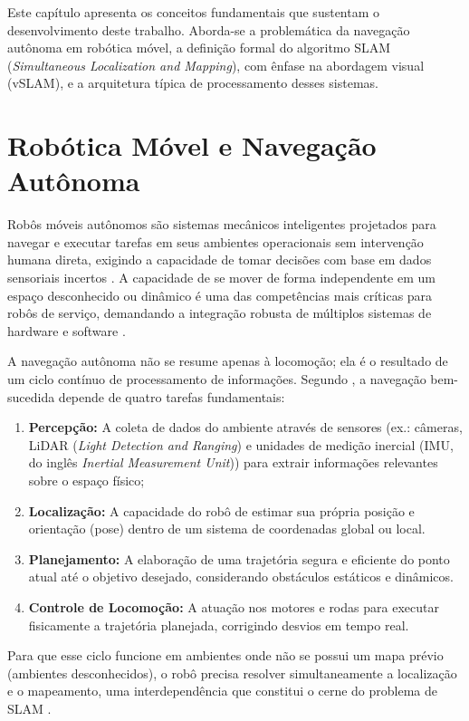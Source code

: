 Este capítulo apresenta os conceitos fundamentais que sustentam o desenvolvimento deste trabalho. Aborda-se a problemática da navegação autônoma em robótica móvel, a definição formal do algoritmo SLAM (\textit{Simultaneous Localization and Mapping}), com ênfase na abordagem visual (vSLAM), e a arquitetura típica de processamento desses sistemas.

\section{Robótica Móvel e Navegação Autônoma}

Robôs móveis autônomos são sistemas mecânicos inteligentes projetados para navegar e executar tarefas em seus ambientes operacionais sem intervenção humana direta, exigindo a capacidade de tomar decisões com base em dados sensoriais incertos \cite{taheri2021slamdefinitionevolution, cadena2016presentfuturesimultaneous}. A capacidade de se mover de forma independente em um espaço desconhecido ou dinâmico é uma das competências mais críticas para robôs de serviço, demandando a integração robusta de múltiplos sistemas de hardware e software \cite{araujo2023atmosbotpropostamodelagem}.

A navegação autônoma não se resume apenas à locomoção; ela é o resultado de um ciclo contínuo de processamento de informações. Segundo , a navegação bem-sucedida depende de quatro tarefas fundamentais:
\begin{enumerate}
    \item \textbf{Percepção:} A coleta de dados do ambiente através de sensores (ex.: câmeras, LiDAR (\textit{Light Detection and Ranging}) e unidades de medição inercial (IMU, do inglês \textit{Inertial Measurement Unit})) para extrair informações relevantes sobre o espaço físico;
    \item \textbf{Localização:} A capacidade do robô de estimar sua própria posição e orientação (pose) dentro de um sistema de coordenadas global ou local.
    \item \textbf{Planejamento:} A elaboração de uma trajetória segura e eficiente do ponto atual até o objetivo desejado, considerando obstáculos estáticos e dinâmicos.
    \item \textbf{Controle de Locomoção:} A atuação nos motores e rodas para executar fisicamente a trajetória planejada, corrigindo desvios em tempo real.
\end{enumerate}

Para que esse ciclo funcione em ambientes onde não se possui um mapa prévio (ambientes desconhecidos), o robô precisa resolver simultaneamente a localização e o mapeamento, uma interdependência que constitui o cerne do problema de SLAM \cite{taheri2021slamdefinitionevolution}.



